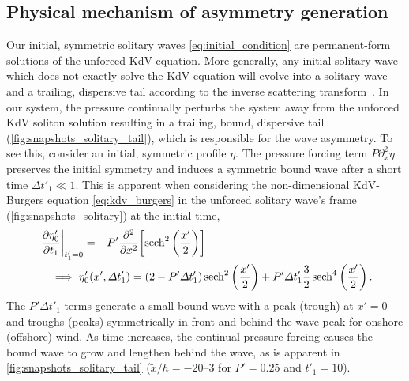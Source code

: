 \documentclass{jfm}
\begin{document}
\subsection{\label{sec:physical_reason} Physical mechanism of asymmetry
generation}
Our initial, symmetric solitary waves \cref{eq:initial_condition} are
permanent-form solutions of the unforced KdV equation.
More generally, any initial solitary wave which does not exactly solve
the KdV equation will evolve into a solitary wave and a trailing,
dispersive tail according to the inverse scattering
transform~\citep[\eg][]{mei2005nonlinear}.
In our system, the pressure continually perturbs the system away from
the unforced KdV soliton solution resulting in a trailing, bound,
dispersive tail (\cref{fig:snapshots_solitary_tail}), which is
responsible for the wave asymmetry.
To see this, consider an initial, symmetric profile $\eta$.
The pressure forcing term $P \partial_x^2 \eta$ preserves the initial
symmetry and induces a symmetric bound wave after a short time $\Delta
t'_1 \ll 1$.
This is apparent when considering the non-dimensional KdV-Burgers
equation \cref{eq:kdv_burgers} in the unforced solitary wave's frame
(\cref{fig:snapshots_solitary}) at the initial time,
\begin{align}
  &\eval{\pdv{\eta'_0}{t_1}}_{t'_1=0} = -P' \pdv[2]{x} \bqty{
  \sech^2\pqty{\frac{x'}{2}}}
  \\
  &\quad \implies \eta'_0(x', \Delta t'_1) =
  (2-P'\Delta t'_1) \sech^2\pqty{\frac{x'}{2}}
  +
  P' \Delta t'_1 \frac{3}{2}\sech^4\pqty{\frac{x'}{2}}
  \,.
  \label{eq:pressure_change}
\end{align}
The $P'\Delta t'_1$ terms generate a small bound wave with a peak
(trough) at $x'=0$ and troughs (peaks) symmetrically in front and behind
the wave peak for onshore (offshore) wind.
As time increases, the continual pressure forcing causes the bound wave
to grow and lengthen behind the wave, as is apparent in
\cref{fig:snapshots_solitary_tail} (\eg $\tilde{x}/h =
\numrange{-20}{3}$ for $P'=0.25$ and $t'_1=10$).
\end{document}
